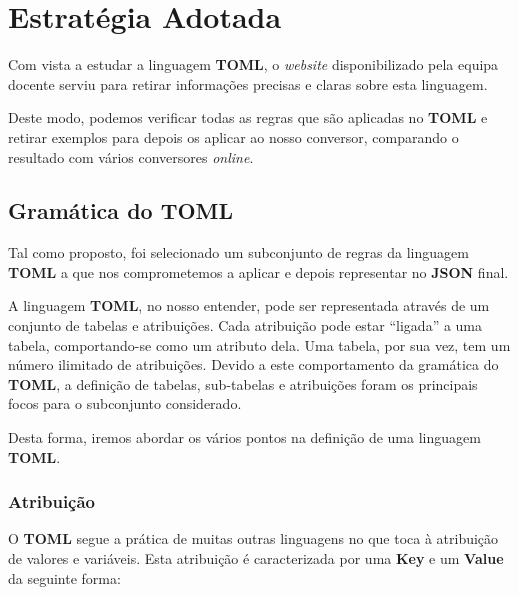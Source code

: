 \documentclass[a4paper,12pt]{report}
\begin{document}
\chapter{Estratégia Adotada}

\par Com vista a estudar a linguagem \textbf{TOML}, o \textit{website} disponibilizado pela equipa docente serviu para retirar informações precisas e claras sobre esta linguagem. \par Deste modo, podemos verificar todas as regras que são aplicadas no \textbf{TOML} e retirar exemplos para depois os aplicar ao nosso conversor, comparando o resultado com vários conversores \textit{online}.

\vspace{0.5cm}

\section{Gramática do TOML}

Tal como proposto, foi selecionado um subconjunto de regras da linguagem \textbf{TOML} a que nos comprometemos a aplicar e depois representar no \textbf{JSON} final.

\vspace{0.3cm}

\par A linguagem \textbf{TOML}, no nosso entender, pode ser representada através de um conjunto de tabelas e atribuições. Cada atribuição pode estar ``ligada'' a uma tabela, comportando-se como um atributo dela. Uma tabela, por sua vez, tem um número ilimitado de atribuições. Devido a este comportamento da gramática do \textbf{TOML}, a definição de tabelas, sub-tabelas e atribuições foram os principais focos para o subconjunto considerado.

\par Desta forma, iremos abordar os vários pontos na definição de uma linguagem \textbf{TOML}.

\vspace{10cm}

\subsection{Atribuição}

O \textbf{TOML} segue a prática de muitas outras linguagens no que toca à atribuição de valores e variáveis. Esta atribuição é caracterizada por uma \textbf{Key} e um \textbf{Value} da seguinte forma:
\end{document}
